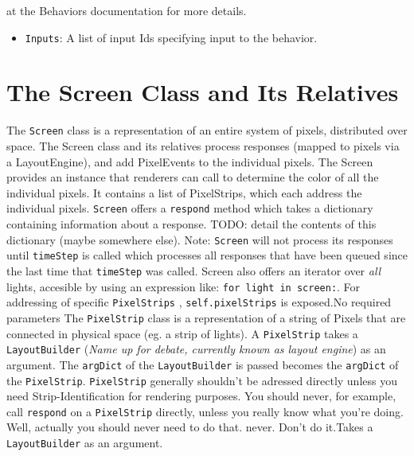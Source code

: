 \documentclass{article}
\begin{document}
\begin{itemize}
{at the Behaviors documentation for more details.}
{\begin{itemize}
    \item \texttt{Inputs}: A list of input Ids specifying input to the
        behavior.  
\end{itemize}}
\section{The Screen Class and Its Relatives}
{The \texttt{Screen} class is a representation of an entire system of pixels,
    distributed over space.  The Screen class and its relatives process
        responses (mapped to pixels via a LayoutEngine), and add PixelEvents
        to the individual pixels.  The Screen provides an instance that
        renderers can call to determine the color of all the individual pixels. It contains a list of PixelStrips, which each
        address the individual pixels.  \texttt{Screen} offers a
        \texttt{respond} method which takes a dictionary containing information
        about a response.  TODO: detail the contents of this dictionary (maybe
                somewhere else).  Note: \texttt{Screen} will not process its
        responses until \texttt{timeStep} is called which processes all responses that
        have been queued since the last time that \texttt{timeStep} was
        called.  Screen also offers an iterator over \textit{all} lights,
    accesible by using an expression like: \texttt{for light in screen:}.  For
        addressing of specific \texttt{PixelStrips} , \texttt{self.pixelStrips}
    is exposed.}{No required parameters}
{The \texttt{PixelStrip} class is a representation of a string of Pixels that are
    connected in physical space (eg. a strip of lights).  A \texttt{PixelStrip} takes a
        \texttt{LayoutBuilder} (\textit{Name up for debate, currently known as layout
            engine}) as an argument.  The \texttt{argDict} of the
        \texttt{LayoutBuilder} is
        passed becomes the \texttt{argDict} of the \texttt{PixelStrip}.
        \texttt{PixelStrip} generally shouldn't be
        adressed directly unless you need Strip-Identification for rendering
        purposes.  You should never, for example, call \texttt{respond} on a
        \texttt{PixelStrip}
        directly, unless you really know what you're doing.  Well, actually you
            should never need to do that.
        never.  Don't do it.}{Takes a \texttt{LayoutBuilder} as an argument.}
    \end{itemize}
\end{document}
